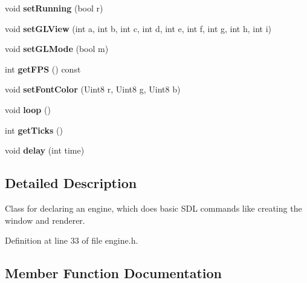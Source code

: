 \begin{DoxyCompactItemize}
\item 
void {\bfseries set\+Running} (bool r)\hypertarget{classEngine_ac5a84be825afebf377e227bcb049a753}{}\label{classEngine_ac5a84be825afebf377e227bcb049a753}

\item 
void {\bfseries set\+G\+L\+View} (int a, int b, int c, int d, int e, int f, int g, int h, int i)\hypertarget{classEngine_ad5387289f39246870a3c40d61b31fed8}{}\label{classEngine_ad5387289f39246870a3c40d61b31fed8}

\item 
void {\bfseries set\+G\+L\+Mode} (bool m)\hypertarget{classEngine_a0ac77a2abc0269f3825a184fbfcef3dd}{}\label{classEngine_a0ac77a2abc0269f3825a184fbfcef3dd}

\item 
int {\bfseries get\+F\+PS} () const \hypertarget{classEngine_a7b4d5a0722d470402278c05fed39c1f1}{}\label{classEngine_a7b4d5a0722d470402278c05fed39c1f1}

\item 
void {\bfseries set\+Font\+Color} (Uint8 r, Uint8 g, Uint8 b)\hypertarget{classEngine_a3658606ab22302767e81ab6d1975d6bd}{}\label{classEngine_a3658606ab22302767e81ab6d1975d6bd}

\item 
void {\bfseries loop} ()\hypertarget{classEngine_a514f8d788ced7c6508b8b6f9ef66ccb1}{}\label{classEngine_a514f8d788ced7c6508b8b6f9ef66ccb1}

\item 
int {\bfseries get\+Ticks} ()\hypertarget{classEngine_adfac6631b6c52bcb43811742aa172d9d}{}\label{classEngine_adfac6631b6c52bcb43811742aa172d9d}

\item 
void {\bfseries delay} (int time)\hypertarget{classEngine_a15aa4850592df8924eb542ff0709bd98}{}\label{classEngine_a15aa4850592df8924eb542ff0709bd98}

\end{DoxyCompactItemize}


\subsection{Detailed Description}
Class for declaring an engine, which does basic S\+DL commands like creating the window and renderer. 

Definition at line 33 of file engine.\+h.



\subsection{Member Function Documentation}
